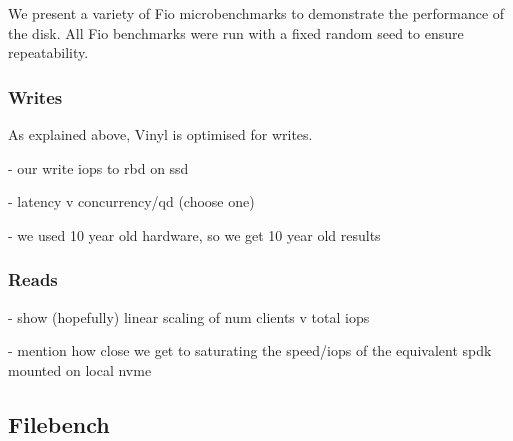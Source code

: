 We present a variety of Fio microbenchmarks to demonstrate the performance of
the disk. All Fio benchmarks were run with a fixed random seed to ensure
repeatability.

\subsubsection{Writes}

As explained above, Vinyl is optimised for writes. 

- our write iops to rbd on ssd

- latency v concurrency/qd (choose one)

- we used 10 year old hardware, so we get 10 year old results

\subsubsection{Reads}

- show (hopefully) linear scaling of num clients v total iops

- mention how close we get to saturating the speed/iops of the equivalent
  spdk mounted on local nvme


\subsection{Filebench}
